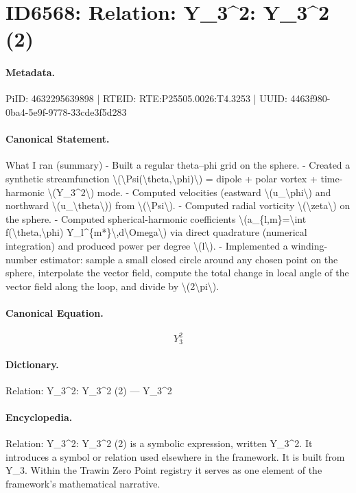 \section*{ID6568: Relation: Y\_3\textasciicircum{}2: Y\_3\textasciicircum{}2 (2)}
\paragraph{Metadata.}
PiID: 4632295639898 | RTEID: RTE:P25505.0026:T4.3253 | UUID: 4463f980-0ba4-5e9f-9778-33cde3f5d283

\paragraph{Canonical Statement.}
What I ran (summary) - Built a regular theta–phi grid on the sphere. - Created a synthetic streamfunction \textbackslash{}(\textbackslash{}Psi(\textbackslash{}theta,\textbackslash{}phi)\textbackslash{}) = dipole + polar vortex + time-harmonic \textbackslash{}(Y\_3\textasciicircum{}2\textbackslash{}) mode. - Computed velocities (eastward \textbackslash{}(u\_\textbackslash{}phi\textbackslash{}) and northward \textbackslash{}(u\_\textbackslash{}theta\textbackslash{})) from \textbackslash{}(\textbackslash{}Psi\textbackslash{}). - Computed radial vorticity \textbackslash{}(\textbackslash{}zeta\textbackslash{}) on the sphere. - Computed spherical-harmonic coefficients \textbackslash{}(a\_\{l,m\}=\textbackslash{}int f(\textbackslash{}theta,\textbackslash{}phi) Y\_l\textasciicircum{}\{m*\}\textbackslash{},d\textbackslash{}Omega\textbackslash{}) via direct quadrature (numerical integration) and produced power per degree \textbackslash{}(l\textbackslash{}). - Implemented a winding-number estimator: sample a small closed circle around any chosen point on the sphere, interpolate the vector field, compute the total change in local angle of the vector field along the loop, and divide by \textbackslash{}(2\textbackslash{}pi\textbackslash{}).

\paragraph{Canonical Equation.}
\[
Y_3^2
\]

\paragraph{Dictionary.}
Relation: Y\_3\textasciicircum{}2: Y\_3\textasciicircum{}2 (2) — Y\_3\textasciicircum{}2

\paragraph{Encyclopedia.}
Relation: Y\_3\textasciicircum{}2: Y\_3\textasciicircum{}2 (2) is a symbolic expression, written Y\_3\textasciicircum{}2. It introduces a symbol or relation used elsewhere in the framework. It is built from Y\_3. Within the Trawin Zero Point registry it serves as one element of the framework's mathematical narrative.
